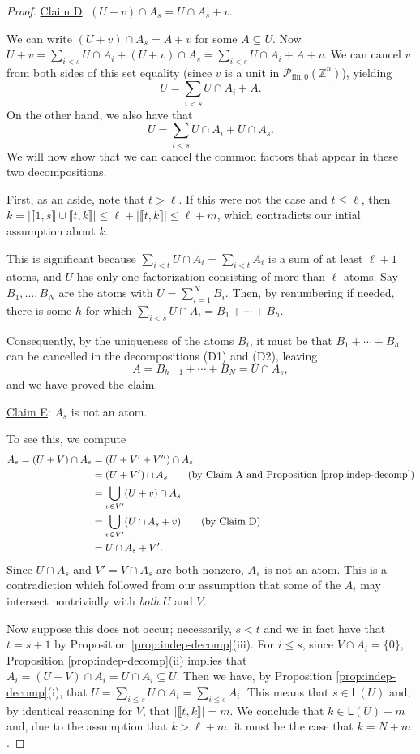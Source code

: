 \documentclass{report}
\renewcommand{\P}{\mathcal{P}}
\newcommand{\ZZ}{\mathbb{Z}}
\newcommand{\llb}{\llbracket}
\newcommand{\rrb}{\rrbracket}
\newcommand{\fon}{{\textrm{fin}, 0}}
\renewcommand{\:}{\text{:}}
\theoremstyle{definition}
\begin{document}
\begin{proof}
\noindent\underline{Claim D}: $(U+v)\cap A_s = U\cap A_s + v$. \label{cld}

We can write $(U+v)\cap A_s = A + v$ for some $A \subseteq U$.
Now $U+v = \sum_{i<s} U\cap A_i + (U+v)\cap A_s = \sum_{i<s} U\cap A_i + A + v$.
We can cancel $v$ from both sides of this set equality (since $v$ is a unit in $\P_\fon(\ZZ^n)$), yielding
\[ U = \sum_{i<s} U\cap A_i + A. \tag{D1}\]
On the other hand, we also have that
\[ U = \sum_{i<s} U\cap A_i + U\cap A_s. \tag{D2}\]
We will now show that we can cancel the common factors that appear in these two decompositions.

First, as an aside, note that $t > \ell$.
If this were not the case and $t \le \ell$, then $k = | \llb 1,s \rrb \cup \llb t,k \rrb | \le \ell + | \llb t,k \rrb | \le \ell+m$, which contradicts our intial assumption about $k$.

This is significant because $\sum_{i<t} U\cap A_i = \sum_{i<t} A_i$ is a sum of at least $\ell+1$ atoms, and $U$ has only one factorization consisting of more than $\ell$ atoms.
Say $B_1,\dots, B_{N}$ are the atoms with $U = \sum_{i=1}^{N} B_i$.
Then, by renumbering if needed, there is some $h$ for which $\sum_{i<s} U\cap A_i = B_1 + \cdots + B_h$.

Consequently, by the uniqueness of the atoms $B_i$, it must be that $B_1 +\cdots + B_h$ can be cancelled in the decompositions (D1) and (D2), leaving
\[ A = B_{h+1} +\cdots+ B_{N} = U\cap A_s, \]
and we have proved the claim.

\noindent\underline{Claim E}: $A_s$ is not an atom. \label{cle}

To see this, we compute
\begin{align*}
A_s = (U+V)\cap A_s 
&= (U+V'+V'') \cap A_s \\
&= (U+V') \cap A_s \tag{by Claim A and Proposition \ref{prop:indep-decomp}} \\
&= \bigcup_{v\in V'} (U+v)\cap A_s \\
&= \bigcup_{v\in V'} (U\cap A_s + v) \tag{by Claim D} \\
&= U\cap A_s + V'.
\end{align*}
Since $U\cap A_s$ and $V' = V\cap A_s$ are both nonzero, $A_s$ is not an atom.
This is a contradiction which followed from our assumption that some of the $A_i$ may intersect nontrivially with \textit{both} $U$ and $V$.

Now suppose this does not occur; necessarily, $s < t$ and we in fact have that $t = s+1$ by Proposition \ref{prop:indep-decomp}(iii).
For $i \le s$, since $V\cap A_i  = \{0\}$, Proposition \ref{prop:indep-decomp}(ii) implies that $A_i = (U+V)\cap A_i = U\cap A_i \subseteq U$.
Then we have, by Proposition \ref{prop:indep-decomp}(i), that $U = \sum_{i\le s} U\cap A_i = \sum_{i\le s} A_i$.
This means that $s\in \mathsf{L}(U)$ and, by identical reasoning for $V$, that $| \llb t,k \rrb| = m$.
We conclude that $k \in \mathsf{L}(U) + m$ and, due to the assumption that $k>\ell+m$, it must be the case that $k = N + m$.
\end{proof}
\end{document}

